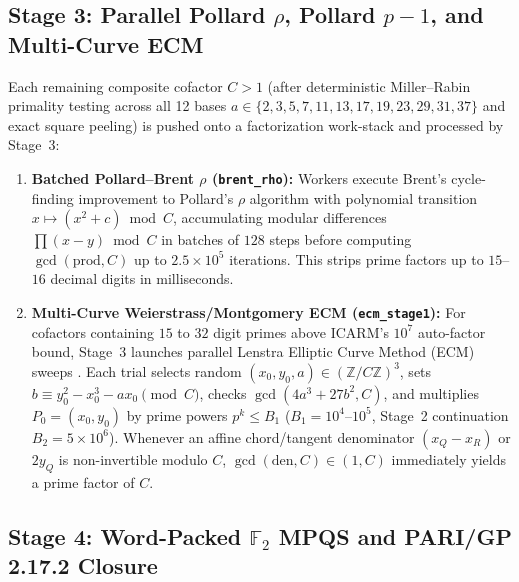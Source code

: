 \documentclass[10pt,a4paper]{article}
\theoremstyle{plain}
\theoremstyle{definition}
\theoremstyle{remark}
\begin{document}
\subsection{\texorpdfstring{Stage 3: Parallel Pollard $\rho$, Pollard $p-1$, and Multi-Curve ECM}{Stage 3: Parallel Pollard rho, Pollard p-1, and Multi-Curve ECM}}

Each remaining composite cofactor $C > 1$ (after deterministic Miller--Rabin primality testing across all 12 bases $a \in \{2, 3, 5, 7, 11, 13, 17, 19, 23, 29, 31, 37\}$ and exact square peeling) is pushed onto a factorization work-stack and processed by Stage~3:
\begin{enumerate}[leftmargin=2em]
    \item \textbf{Batched Pollard--Brent $\rho$ (\texttt{brent\_rho}):} Workers execute Brent's cycle-finding improvement to Pollard's $\rho$ algorithm with polynomial transition $x \mapsto (x^2 + c) \bmod C$, accumulating modular differences $\prod (x - y) \bmod C$ in batches of $128$ steps before computing $\gcd(\text{prod}, C)$ up to $2.5 \times 10^5$ iterations. This strips prime factors up to $15$--$16$ decimal digits in milliseconds.
    \item \textbf{Multi-Curve Weierstrass/Montgomery ECM (\texttt{ecm\_stage1}):} For cofactors containing $15$ to $32$ digit primes above ICARM's $10^7$ auto-factor bound, Stage~3 launches parallel Lenstra Elliptic Curve Method (ECM) sweeps \cite{lenstra1987factoring}. Each trial selects random $(x_0, y_0, a) \in (\mathbb{Z}/C\mathbb{Z})^3$, sets $b \equiv y_0^2 - x_0^3 - a x_0 \pmod C$, checks $\gcd(4a^3 + 27b^2, C)$, and multiplies $P_0 = (x_0, y_0)$ by prime powers $p^k \le B_1$ ($B_1 = 10^4\text{--}10^5$, Stage~2 continuation $B_2 = 5 \times 10^6$). Whenever an affine chord/tangent denominator $(x_Q - x_R)$ or $2y_Q$ is non-invertible modulo $C$, $\gcd(\mathrm{den}, C) \in (1, C)$ immediately yields a prime factor of $C$.
\end{enumerate}

\subsection{\texorpdfstring{Stage 4: Word-Packed $\mathbb{F}_2$ MPQS and PARI/GP 2.17.2 Closure}{Stage 4: Word-Packed F2 MPQS and PARI/GP 2.17.2 Closure}}
\end{document}
